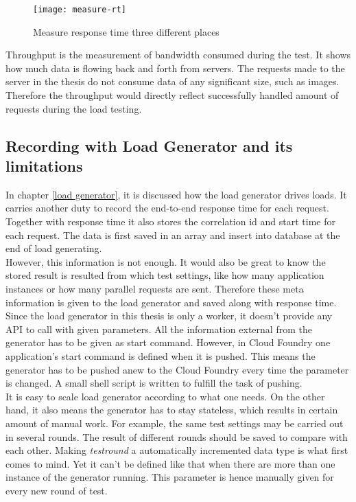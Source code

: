 \begin{figure}[h]
	\centering
	\texttt{[image: measure-rt]}
	\caption{Measure response time three different places}
	\label{measure-rt}
\end{figure}

Throughput is the measurement of bandwidth consumed during the test. It shows how much data is flowing back and forth from servers. The requests made to the server in the thesis do not consume data of any significant size, such as images. Therefore the throughput would directly reflect successfully handled amount of requests during the load testing. \\
\subsection{Recording with Load Generator and its limitations}
 In chapter \ref{load generator}, it is discussed how the load generator drives loads. It carries another duty to record the end-to-end response time for each request. Together with response time it also stores the correlation id and start time for each request. The data is first saved in an array and insert into database at the end of load generating. \\
 However, this information is not enough. It would also be great to know the stored result is resulted from which test settings, like how many application instances or how many parallel requests are sent. Therefore these meta information is given to the load generator and saved along with response time. Since the load generator in this thesis is only a worker, it doesn't provide any API to call with given parameters. All the information external from the generator has to be given as start command. However, in Cloud Foundry one application's start command is defined when it is pushed. This means the generator has to be pushed anew to the Cloud Foundry every time the parameter is changed. A small shell script is written to fulfill the task of pushing. \\
 
 It is easy to scale load generator according to what one needs. On the other hand, it also means the generator has to stay stateless, which results in certain amount of manual work. For example, the same test settings may be carried out in several rounds. The result of different rounds should be saved to compare with each other. Making \textit{testround }a automatically incremented data type is what first comes to mind. Yet it can't be defined like that when there are more than one instance of the generator running. This parameter is hence manually given for every new round of test.\\
 

